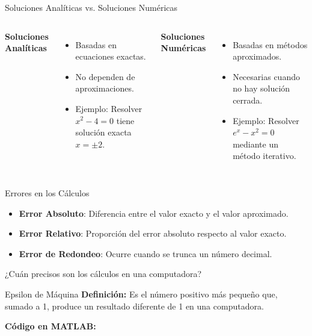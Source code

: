 \documentclass{beamer}
\begin{document}
\begin{frame}{Soluciones Analíticas vs. Soluciones Numéricas}
    \begin{columns}
        \textbf{Soluciones Analíticas}
        \begin{itemize}
            \item Basadas en ecuaciones exactas.
            \item No dependen de aproximaciones.
            \item Ejemplo: Resolver $x^2 - 4 = 0$ tiene solución exacta $x = \pm2$.
        \end{itemize}
        
        \textbf{Soluciones Numéricas}
        \begin{itemize}
            \item Basadas en métodos aproximados.
            \item Necesarias cuando no hay solución cerrada.
            \item Ejemplo: Resolver $e^x - x^2 = 0$ mediante un método iterativo.
        \end{itemize}
    \end{columns}
\end{frame}

\begin{frame}{Errores en los Cálculos}
    \begin{itemize}
        \item \textbf{Error Absoluto}: Diferencia entre el valor exacto y el valor aproximado.
        \item \textbf{Error Relativo}: Proporción del error absoluto respecto al valor exacto.
        \item \textbf{Error de Redondeo}: Ocurre cuando se trunca un número decimal.
    \end{itemize}
    \centering
\end{frame}

\begin{frame}
    \centering
    \Large ¿Cuán precisos son los cálculos en una computadora?
\end{frame}

\begin{frame}{Epsilon de Máquina}
    \textbf{Definición:} Es el número positivo más pequeño que, sumado a 1, produce un resultado diferente de 1 en una computadora.

    \vspace{0.5cm} %

    \textbf{Código en MATLAB:}
    

    
    \vspace{0.5cm} %
\end{frame}
\end{document}
